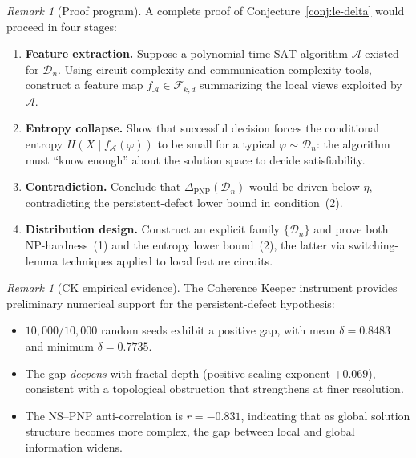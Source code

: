 \documentclass[11pt]{article}
\theoremstyle{definition}
\theoremstyle{remark}
\newtheorem{remark}[theorem]{Remark}
\newcommand{\SAT}{\mathrm{SAT}}
\begin{document}
\begin{remark}[Proof program]
\label{rem:proof-program}
A complete proof of Conjecture~\ref{conj:le-delta} would proceed in
four stages:
\begin{enumerate}[label=\textup{(\roman*)},nosep]
\item \textbf{Feature extraction.}\;
  Suppose a polynomial-time $\SAT$ algorithm $\mathcal{A}$ existed
  for $\mathcal{D}_n$.  Using circuit-complexity and
  communication-complexity tools, construct a feature map
  $f_{\mathcal{A}} \in \mathcal{F}_{k,d}$ summarizing the local views
  exploited by $\mathcal{A}$.
\item \textbf{Entropy collapse.}\;
  Show that successful decision forces the conditional entropy
  $H(X \mid f_{\mathcal{A}}(\varphi))$ to be small for a typical
  $\varphi \sim \mathcal{D}_n$: the algorithm must ``know enough''
  about the solution space to decide satisfiability.
\item \textbf{Contradiction.}\;
  Conclude that $\Delta_{\mathrm{PNP}}(\mathcal{D}_n)$ would be
  driven below $\eta$, contradicting the persistent-defect lower
  bound in condition~\textup{(2)}.
\item \textbf{Distribution design.}\;
  Construct an explicit family $\{\mathcal{D}_n\}$ and prove both
  NP-hardness~\textup{(1)} and the entropy lower bound~\textup{(2)},
  the latter via switching-lemma techniques applied to local feature
  circuits.
\end{enumerate}
\end{remark}

\begin{remark}[CK empirical evidence]
\label{rem:ck-empirical}
The Coherence Keeper instrument provides preliminary numerical
support for the persistent-defect hypothesis:
\begin{itemize}[nosep]
\item $10{,}000 / 10{,}000$ random seeds exhibit a positive gap, with
  mean $\delta = 0.8483$ and minimum $\delta = 0.7735$.
\item The gap \emph{deepens} with fractal depth (positive scaling
  exponent $+0.069$), consistent with a topological obstruction that
  strengthens at finer resolution.
\item The NS--PNP anti-correlation is $r = -0.831$, indicating that
  as global solution structure becomes more complex, the gap between
  local and global information widens.
\end{itemize}
\end{remark}
\end{document}
